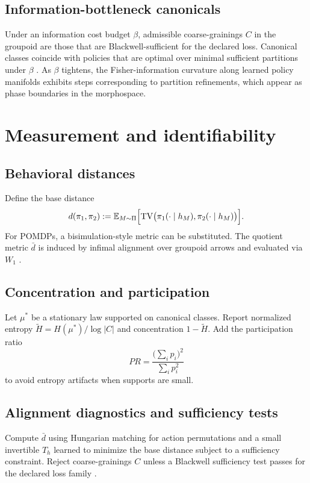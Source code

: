 \documentclass[11pt]{article}
\newcommand{\E}{\mathbb{E}}
\newcommand{\1}{\mathbbm{1}}
\newcommand{\Wone}{W_1}
\newcommand{\TV}{\mathrm{TV}}
\begin{document}
\subsection{Information-bottleneck canonicals}
\begin{proposition}\label{prop:ib}
Under an information cost budget $\beta$, admissible coarse-grainings $C$ in the groupoid are those that are Blackwell-sufficient for the declared loss. Canonical classes coincide with policies that are optimal over minimal sufficient partitions under $\beta$ \parencite{Blackwell1953,CoverThomas2006}. As $\beta$ tightens, the Fisher-information curvature along learned policy manifolds exhibits steps corresponding to partition refinements, which appear as phase boundaries in the morphospace.
\end{proposition}

\section{Measurement and identifiability}
\subsection{Behavioral distances}
Define the base distance
\[
d(\pi_1,\pi_2) := \E_{M \sim \Pi} \Bigl[\TV\bigl(\pi_1(\cdot \mid h_M), \pi_2(\cdot \mid h_M)\bigr)\Bigr].
\]
For POMDPs, a bisimulation-style metric can be substituted. The quotient metric $\bar d$ is induced by infimal alignment over groupoid arrows and evaluated via $\Wone$ \parencite{Villani2009}.

\subsection{Concentration and participation}
Let $\mu^*$ be a stationary law supported on canonical classes. Report normalized entropy $\tilde H = H(\mu^*) / \log |C|$ and concentration $1 - \tilde H$. Add the participation ratio
\[
PR = \frac{\bigl(\sum_i p_i\bigr)^2}{\sum_i p_i^2}
\]
to avoid entropy artifacts when supports are small.

\subsection{Alignment diagnostics and sufficiency tests}
Compute $\bar d$ using Hungarian matching for action permutations and a small invertible $T_h$ learned to minimize the base distance subject to a sufficiency constraint. Reject coarse-grainings $C$ unless a Blackwell sufficiency test passes for the declared loss family \parencite{Blackwell1953}.
\end{document}
